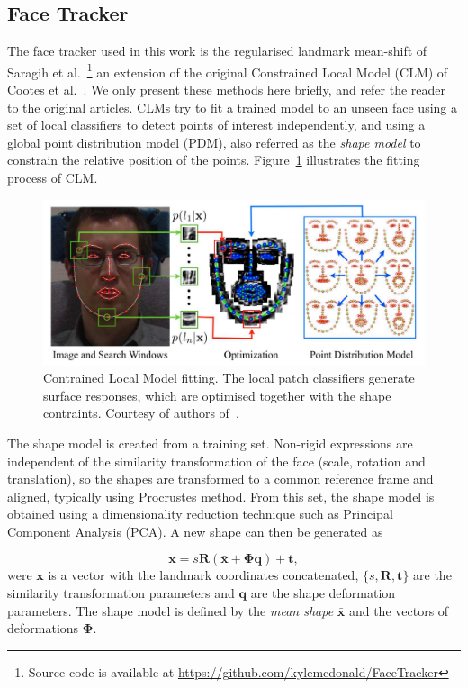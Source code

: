 \documentclass[]{article}
\begin{document}
\subsection{Face Tracker}
The face tracker used in this work is the regularised landmark mean-shift of Saragih et
al.~\cite{saragih2011deformable}\footnote{Source code is available at
  \url{https://github.com/kylemcdonald/FaceTracker}} an extension of
the original Constrained Local Model (CLM) of Cootes et al.~\cite{cristinacce2006feature}. We only present these methods
here briefly, and refer the reader to the original articles. CLMs try to fit a trained model to an unseen face using a
set of local classifiers to detect points of interest independently, and using a global point distribution model (PDM),
also referred as the \textit{shape model} to constrain the relative position of the points. Figure~\ref{fig:CLM} illustrates the fitting process of CLM.

\begin{figure}[htbp]
  \centering
  \includegraphics[width=12cm]{figures/CLM.png}
  \caption{Contrained Local Model fitting. The local patch classifiers generate surface responses, which are optimised
 together with the shape contraints. Courtesy of authors of~\cite{saragih2011deformable}.}
  \label{fig:CLM}
\end{figure}




The shape model is created from a training set. Non-rigid expressions are independent of the similarity transformation
of the face (scale, rotation and translation), so the shapes are transformed to a common reference frame and aligned,
typically using Procrustes method. From this set, the shape model is obtained using a dimensionality reduction technique
such as Principal Component Analysis (PCA). A new shape can then be generated as

\begin{equation}
  \label{eq:shape_model}
  \mathbf{x} = s\mathbf{R}(\bar{\mathbf{x}} +
  \boldsymbol{\Phi}\mathbf{q}) + \mathbf{t},
\end{equation}
were $\mathbf{x}$ is a vector with the landmark coordinates concatenated, 
$\{s,\mathbf{R},\mathbf{t}\}$ are the similarity transformation
parameters and $\mathbf{q}$ are the shape deformation parameters. The
shape model is defined by the \textit{mean shape} $\mathbf{\bar{x}}$
and the vectors of deformations $\boldsymbol{\Phi}$.
\end{document}
